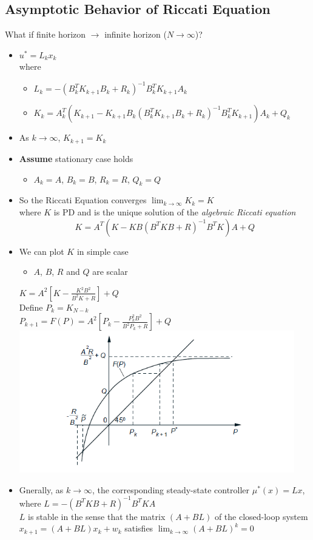\subsection{Asymptotic Behavior of Riccati Equation}
What if finite horizon $\to$ infinite horizon ($N\to\infty$)?
\begin{itemize}
    \item $u^*=L_kx_k$\\
    where
    \begin{itemize}
        \item $L_k=-(B_k^TK_{k+1}B_k+R_k)^{-1}B_k^TK_{k+1}A_k$
        \item $K_k = A_k^T(K_{k+1}-K_{k+1}B_k(B_k^TK_{k+1}B_k+R_k)^{-1}B_k^TK_{k+1})A_k+Q_k$
    \end{itemize}
    \item As $k\to \infty$, $K_{k+1}=K_k$
    \item \textbf{Assume} stationary case holds
    \begin{itemize}
        \item $A_k=A$, $B_k=B$, $R_k=R$, $Q_k=Q$
    \end{itemize}
    \item So the Riccati Equation converges $\lim_{k\to\infty}K_k=K$\\ where $K$ is PD and is the unique solution of the \emph{algebraic Riccati equation} \\
    \[ K = A^T(K-KB(B^TKB+R)^{-1}B^TK)A+Q \]
    \item We can plot $K$ in simple case 
    \begin{itemize}
        \item $A$, $B$, $R$ and $Q$ are scalar 
    \end{itemize}
    $K=A^2\left[ K-\frac{K^2B^2}{B^2K+R} \right] + Q$\\
    Define $P_k=K_{N-k}$ \\
    $P_{k+1}=F(P)=A^2\left[ P_k-\frac{P_k^2B^2}{B^2P_k+R} \right] + Q$\\
    \includegraphics[width=12cm]{Lecture4/Fig1.png}
    \item Gnerally, as $k\to\infty$, the corresponding steady-state controller $\mu^*(x)=Lx$, \\
    where $L=-(B^TKB+R)^{-1}B^TKA$ \\ $L$ is stable in the sense that the matrix $(A+BL)$ of the closed-loop system \\
    $x_{k+1}=(A+BL)x_k+w_k$ satisfies $\lim_{k\to\infty}(A+BL)^k=0$
\end{itemize}

